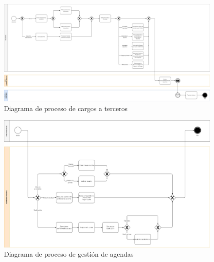 \documentclass[12pt, a4paper, twoside, openright]{report}
\begin{document}
\begin{figure}
    \centering
    \begin{sideways}
        \includegraphics[width=0.95\textheight]{img/proceso-cargos.png}
    \end{sideways}
    \caption{Diagrama de proceso de cargos a terceros}
    \label{fig:proceso-cargos}
\end{figure}

\begin{figure}
    \centering
    \begin{sideways}
        \includegraphics[width=0.95\textheight]{img/proceso-agendas.png}
    \end{sideways}
    \caption{Diagrama de proceso de gestión de agendas}
    \label{fig:proceso-agendas}
\end{figure}

\printnoidxglossaries

\printbibliography
\end{document}
